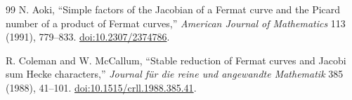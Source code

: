 \begin{thebibliography}{99}
N. Aoki,
``Simple factors of the Jacobian of a Fermat curve and the Picard number of a product of Fermat curves,''
\emph{American Journal of Mathematics} 113 (1991), 779--833.
\href{https://doi.org/10.2307/2374786}{doi:10.2307/2374786}.

R. Coleman and W. McCallum,
``Stable reduction of Fermat curves and Jacobi sum Hecke characters,''
\emph{Journal f\"ur die reine und angewandte Mathematik} 385 (1988), 41--101.
\href{https://doi.org/10.1515/crll.1988.385.41}{doi:10.1515/crll.1988.385.41}.

\end{thebibliography}
\endgroup
